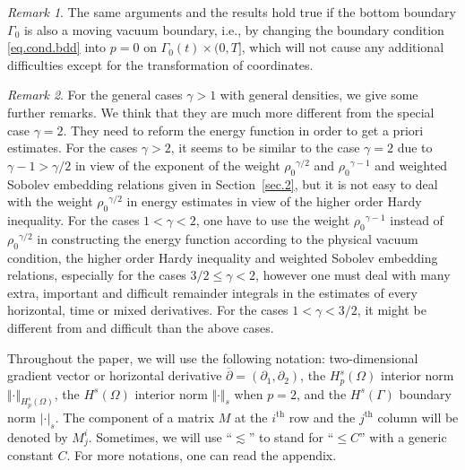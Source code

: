\documentclass[12pt,twoside,reqno]{amsart}
\numberwithin{equation}{section}
\theoremstyle{definition}
\theoremstyle{remark}
\newtheorem{remark}{Remark}[section]
\begin{document}
\begin{remark}
  The same arguments and the results hold true if the bottom boundary $\Gamma_0$ is also a moving vacuum boundary, i.e., by changing the boundary condition \eqref{eq.cond.bdd} into $p=0$ on $\Gamma_0(t)\times (0,T]$, which will not cause any additional difficulties except for the transformation of coordinates.
\end{remark}

\begin{remark}
  For the general cases $\gamma>1$ with general densities, we give some further remarks. We think that they are much more different from the special case $\gamma=2$. They need to reform the energy function in order to get a priori estimates. For the cases $\gamma>2$, it seems to be similar to the case $\gamma=2$ due to $\gamma-1>\gamma/2$ in view of the exponent of the weight ${\rho_0}^{\gamma/2}$ and ${\rho_0}^{\gamma-1}$ and weighted Sobolev embedding relations given in Section~\ref{sec.2}, but it is not easy to deal with the weight ${\rho_0}^{\gamma/2}$ in energy estimates in view of the higher order Hardy inequality. For the cases $1<\gamma<2$, one have to use the weight ${\rho_0}^{\gamma-1}$ instead of ${\rho_0}^{\gamma/2}$ in constructing the energy function according to the physical vacuum condition, the higher order Hardy inequality and  weighted Sobolev embedding relations, especially for the cases $3/2{\leqslant} \gamma<2$, however one must deal with many extra, important and difficult remainder integrals in the estimates of every horizontal, time or mixed derivatives. For the cases $1<\gamma<3/2$, it might be different from and difficult than the above cases.
\end{remark}

Throughout the paper, we will use the following notation: two-dimensional gradient vector or horizontal derivative ${\overline{\partial}}=({\partial}_1,{\partial}_2)$, the $H_p^s(\Omega)$ interior norm ${\Vert{\cdot}\Vert}_{H_p^s(\Omega)}$, the $H^s(\Omega)$ interior norm ${\Vert{\cdot}\Vert}_s$ when $p=2$, and the $H^s({\Gamma})$ boundary norm ${\vert{\cdot}\vert}_s$. The component of a matrix $M$ at the $i^{\mathrm{th}}$ row and the $j^{\mathrm{th}}$ column will be denoted by $M^i_j$. Sometimes, we will use ``$\lesssim$'' to stand for ``${\leqslant} C$'' with a generic constant $C$. For more notations, one can read the appendix.
\end{document}
